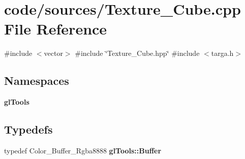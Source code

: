 \section{code/sources/\+Texture\+\_\+\+Cube.cpp File Reference}
\label{_texture___cube_8cpp}
{\ttfamily \#include $<$vector$>$}\newline
{\ttfamily \#include \char`\"{}Texture\+\_\+\+Cube.\+hpp\char`\"{}}\newline
{\ttfamily \#include $<$targa.\+h$>$}\newline
\subsection*{Namespaces}
\begin{DoxyCompactItemize}
\item 
 \textbf{ gl\+Tools}
\end{DoxyCompactItemize}
\subsection*{Typedefs}
\begin{DoxyCompactItemize}
\item 
typedef Color\+\_\+\+Buffer\+\_\+\+Rgba8888 \textbf{ gl\+Tools\+::\+Buffer}
\end{DoxyCompactItemize}
